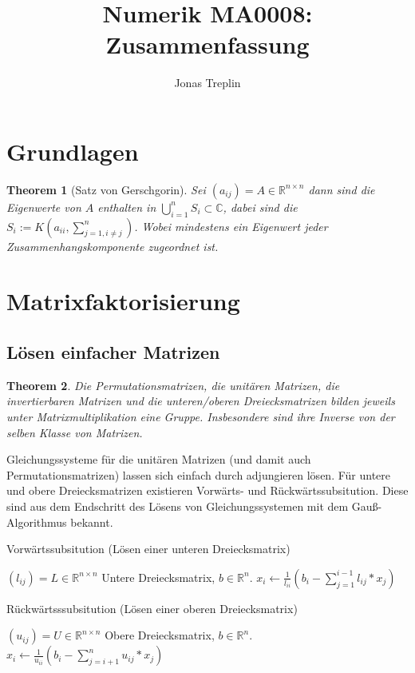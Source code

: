 \documentclass[10pt,a4paper]{article}
\title{Numerik MA0008: Zusammenfassung}
\author{Jonas Treplin}
\newtheorem{theorem}{Theorem}
\begin{document}
	\maketitle
	\section{Grundlagen}
	\begin{theorem}[Satz von Gerschgorin]
		Sei $(a_{ij})=A \in \mathbb{R}^{n\times n}$ dann sind die Eigenwerte von $A$ enthalten in $\bigcup_{i=1}^{n}S_i \subset \mathbb{C}$, dabei sind die $S_i := K(a_{ii}, \sum_{j=1, i\neq j}^{n})$. Wobei mindestens ein Eigenwert jeder Zusammenhangskomponente zugeordnet ist.
	\end{theorem}
	\section{Matrixfaktorisierung}
	\subsection{Lösen einfacher Matrizen}
	\begin{theorem}
		Die Permutationsmatrizen, die unitären Matrizen, die invertierbaren Matrizen und die unteren/oberen Dreiecksmatrizen bilden jeweils unter Matrixmultiplikation eine Gruppe. Insbesondere sind ihre Inverse von der selben Klasse von Matrizen. 
	\end{theorem}
	Gleichungssysteme für die unitären Matrizen (und damit auch Permutationsmatrizen) lassen sich einfach durch adjungieren lösen. Für untere und obere Dreiecksmatrizen existieren Vorwärts- und Rückwärtssubsitution.  Diese sind aus dem Endschritt des Lösens von Gleichungssystemen mit dem Gauß-Algorithmus bekannt.
	\begin{algorithm}
		\caption{Vorwärtssubsitution (Lösen einer unteren Dreiecksmatrix)}
		\begin{algorithmic}
			\Require $(l_{ij}) = L \in \mathbb{R}^{n\times n}$ Untere Dreiecksmatrix, $b \in \mathbb{R}^n$.
				\State $x_i \leftarrow \frac{1}{l_{ii}}(b_i - \sum_{j=1}^{i-1}l_{ij}*x_j)$
			\EndFor
		\end{algorithmic}
	\end{algorithm}
	\begin{algorithm}
		\caption{Rückwärtsssubsitution (Lösen einer oberen Dreiecksmatrix)}
		\begin{algorithmic}
			\Require $(u_{ij}) = U \in \mathbb{R}^{n\times n}$ Obere Dreiecksmatrix, $b \in \mathbb{R}^n$.
			\For{$i\in n:1$}
			\State $x_i \leftarrow \frac{1}{u_{ii}}(b_i - \sum_{j=i+1}^{n}u_{ij}*x_j)$
			\EndFor
		\end{algorithmic}
	\end{algorithm}
\end{document}
